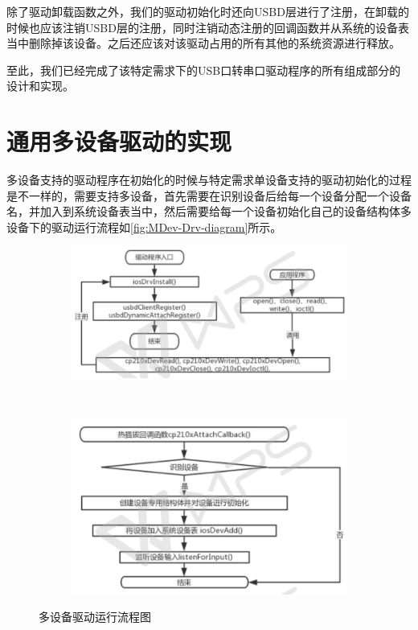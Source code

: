 除了驱动卸载函数之外，我们的驱动初始化时还向USBD层进行了注册，在卸载的时候也应该注销USBD层的注册，同时注销动态注册的回调函数并从系统的设备表当中删除掉该设备。之后还应该对该驱动占用的所有其他的系统资源进行释放。



至此，我们已经完成了该特定需求下的USB口转串口驱动程序的所有组成部分的设计和实现。

\section{通用多设备驱动的实现}
多设备支持的驱动程序在初始化的时候与特定需求单设备支持的驱动初始化的过程是不一样的，需要支持多设备，首先需要在识别设备后给每一个设备分配一个设备名，并加入到系统设备表当中，然后需要给每一个设备初始化自己的设备结构体多设备下的驱动运行流程如\autoref{fig:MDev-Drv-diagram}所示。

\begin{figure}[p, !h]
\centering
  \begin{subfigure}[b]{1.0\textwidth}
  \includegraphics[width=\textwidth]{./graphics/MDev-Drv-Diagram-a.pdf}
  \caption{}\label{fig:MDevice-Driver-diagram-a}
  \end{subfigure}
  ~
  \begin{subfigure}[b]{1.0\textwidth}
  \includegraphics[width=\textwidth]{./graphics/MDev-Drv-Diagram-b.pdf}
  \caption{}\label{fig:MDevice-Driver-diagram-b}
  \end{subfigure}
\caption{多设备驱动运行流程图}\label{fig:MDev-Drv-diagram}
\end{figure}


